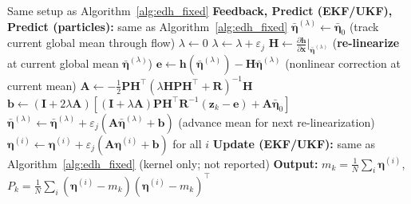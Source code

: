 \documentclass{article}
\begin{document}
\begin{algorithm}[H]
\caption{EDH Flow Filter (Intermediate Re-linearization)}
\label{alg:edh_relinear}
\begin{algorithmic}[1]
\REQUIRE Same setup as Algorithm~\ref{alg:edh_fixed}
  \STATE \textbf{Feedback, Predict (EKF/UKF), Predict (particles):} same as Algorithm~\ref{alg:edh_fixed}
  \STATE $\bar{\boldsymbol{\eta}}^{(\lambda)} \leftarrow \bar{\boldsymbol{\eta}}_0$ \hfill (track current global mean through flow)
  \STATE $\lambda \leftarrow 0$
    \STATE $\lambda \leftarrow \lambda + \varepsilon_j$
    \STATE $\mathbf{H} \leftarrow \frac{\partial \mathbf{h}}{\partial \mathbf{x}}\Big|_{\bar{\boldsymbol{\eta}}^{(\lambda)}}$ \hfill (\textbf{re-linearize} at current global mean $\bar{\boldsymbol{\eta}}^{(\lambda)}$)
    \STATE $\mathbf{e} \leftarrow \mathbf{h}(\bar{\boldsymbol{\eta}}^{(\lambda)}) - \mathbf{H}\bar{\boldsymbol{\eta}}^{(\lambda)}$ \hfill (nonlinear correction at current mean)
    \STATE $\mathbf{A} \leftarrow -\tfrac{1}{2}\mathbf{P}\mathbf{H}^\top(\lambda\mathbf{H}\mathbf{P}\mathbf{H}^\top + \mathbf{R})^{-1}\mathbf{H}$
    \STATE $\mathbf{b} \leftarrow (\mathbf{I}+2\lambda\mathbf{A})[(\mathbf{I}+\lambda\mathbf{A})\mathbf{P}\mathbf{H}^\top\mathbf{R}^{-1}(\mathbf{z}_k - \mathbf{e}) + \mathbf{A}\bar{\boldsymbol{\eta}}_0]$
    \STATE $\bar{\boldsymbol{\eta}}^{(\lambda)} \leftarrow \bar{\boldsymbol{\eta}}^{(\lambda)} + \varepsilon_j(\mathbf{A}\bar{\boldsymbol{\eta}}^{(\lambda)} + \mathbf{b})$ \hfill (advance mean for next re-linearization)
    \STATE $\boldsymbol{\eta}^{(i)} \leftarrow \boldsymbol{\eta}^{(i)} + \varepsilon_j(\mathbf{A}\boldsymbol{\eta}^{(i)} + \mathbf{b})$ for all $i$
  \ENDFOR
  \STATE \textbf{Update (EKF/UKF):} same as Algorithm~\ref{alg:edh_fixed} \hfill (kernel only; not reported)
  \STATE \textbf{Output:} $m_k = \frac{1}{N}\sum_i \boldsymbol{\eta}^{(i)}$, \; $P_k = \frac{1}{N}\sum_i(\boldsymbol{\eta}^{(i)}-m_k)(\boldsymbol{\eta}^{(i)}-m_k)^\top$
\ENDFOR
\end{algorithmic}
\end{algorithm}
\end{document}
